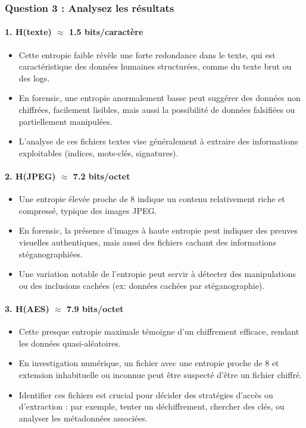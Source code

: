 \documentclass[12pt, a4paper]{article}
\begin{document}
	\subsubsection*{Question 3 : Analysez les résultats}
	
	\paragraph{1. H(texte) $\approx$ 1.5 bits/caractère}
	\begin{itemize}
		\item Cette entropie faible révèle une forte redondance dans le texte, qui est caractéristique des données humaines structurées, comme du texte brut ou des logs.
		\item En forensic, une entropie anormalement basse peut suggérer des données non chiffrées, facilement lisibles, mais aussi la possibilité de données falsifiées ou partiellement manipulées.
		\item L'analyse de ces fichiers textes vise généralement à extraire des informations exploitables (indices, mots-clés, signatures).
	\end{itemize}
	
	\paragraph{2. H(JPEG) $\approx$ 7.2 bits/octet}
	\begin{itemize}
		\item Une entropie élevée proche de 8 indique un contenu relativement riche et compressé, typique des images JPEG.
		\item En forensic, la présence d'images à haute entropie peut indiquer des preuves visuelles authentiques, mais aussi des fichiers cachant des informations stéganographiées.
		\item Une variation notable de l'entropie peut servir à détecter des manipulations ou des inclusions cachées (ex: données cachées par stéganographie).
	\end{itemize}
	
	\paragraph{3. H(AES) $\approx$ 7.9 bits/octet}
	\begin{itemize}
		\item Cette presque entropie maximale témoigne d'un chiffrement efficace, rendant les données quasi-aléatoires.
		\item En investigation numérique, un fichier avec une entropie proche de 8 et extension inhabituelle ou inconnue peut être suspecté d'être un fichier chiffré.
		\item Identifier ces fichiers est crucial pour décider des stratégies d'accès ou d'extraction : par exemple, tenter un déchiffrement, chercher des clés, ou analyser les métadonnées associées.
	\end{itemize}
	
\end{document}
